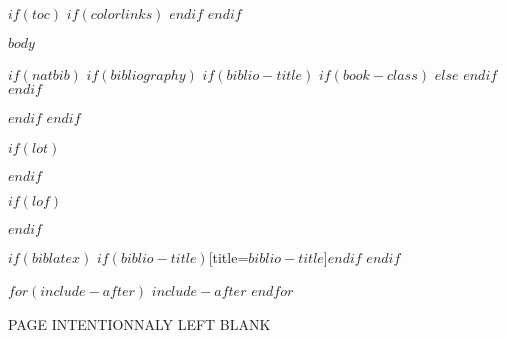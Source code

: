 \documentclass[$if(fontsize)$$fontsize$,$endif$$if(lang)$$babel-lang$,$endif$$if(papersize)$$papersize$paper,$endif$$for(classoption)$$classoption$$sep$,$endfor$]{$documentclass$}
\begin{document}
$if(toc)$
    {
        $if(colorlinks)$
            \hypersetup{linkcolor=$if(toccolor)$$toccolor$$else$black$endif$}
        $endif$
        \setcounter{tocdepth}{$toc-depth$}
        \tableofcontents
        \newpage
    }
$endif$

\pagestyle{fancy}
$body$
\newpage

$if(natbib)$
    $if(bibliography)$
        $if(biblio-title)$
            $if(book-class)$
                \renewcommand\bibname{$biblio-title$}
            $else$
                \renewcommand\refname{$biblio-title$}
            $endif$
        $endif$
        
        \newpage
    $endif$
$endif$

$if(lot)$
    \listoftables
    \newpage
$endif$

$if(lof)$
    \listoffigures
    \newpage
$endif$

$if(biblatex)$
    \printbibliography$if(biblio-title)$[title=$biblio-title$]$endif$
    \newpage
$endif$

$for(include-after)$
    $include-after$
    \newpage
$endfor$
\newpage
\thispagestyle{empty}
\clearpage
\vspace*{\fill}
\begin{center}
\begin{minipage}{.6\textwidth}
\centering PAGE INTENTIONNALY LEFT BLANK
\end{minipage}
\end{center}
\vfill %
\clearpage
\end{document}
